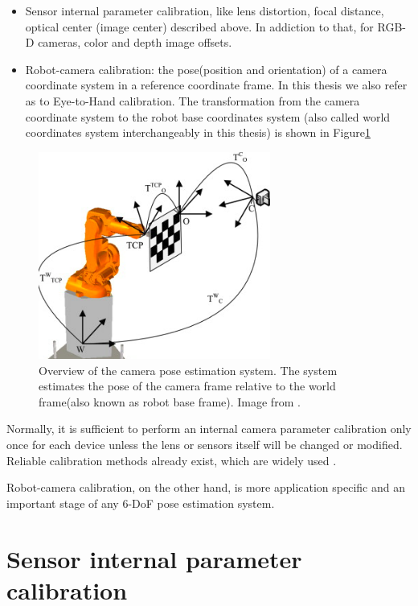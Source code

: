 \begin{itemize}
\item Sensor internal parameter calibration, like lens distortion, focal distance, optical center (image center) described above. In addiction to that, for RGB-D cameras, color and depth image offsets.
\item Robot-camera calibration: the pose(position and orientation) of a camera coordinate system in a reference coordinate frame. In this thesis we also refer as to Eye-to-Hand calibration. The transformation from the camera coordinate system to the robot base coordinates system (also called world coordinates system interchangeably in this thesis) is shown in Figure\ref{fig:system0} 

\end{itemize}
\begin{figure}[!h]
\begin{center}
\includegraphics[width=3in]{figures03/system1.png}
\caption{Overview of the camera pose estimation system. The system estimates  the pose of the camera frame relative to the world frame(also known as robot base frame). Image from \cite{autCAL}.}
\label{fig:system0}
\end{center}
\end{figure}

Normally, it is sufficient to perform an internal camera parameter calibration only once for each device unless the lens or sensors itself will be changed or modified. Reliable calibration methods already exist, which are widely used \cite{Zhang} \cite{Tsai}.

Robot-camera calibration, on the other hand, is more application specific and an important stage of any 6-DoF pose estimation system. 

\section{Sensor internal parameter calibration}

